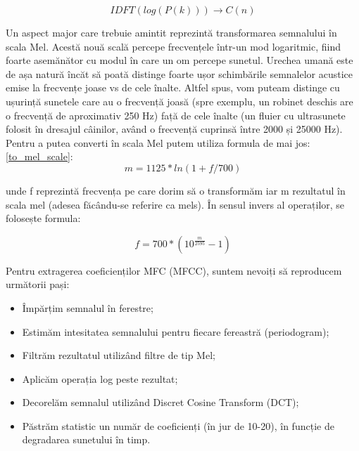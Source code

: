 \documentclass[a4paper,12pt]{report}
\begin{document}
    \begin{equation}
    \label{cepstrum_formula}
   	 	IDFT(log(P(k))) \rightarrow C(n)
    \end{equation}
    
    Un aspect major care trebuie amintit reprezintă transformarea semnalului în scala Mel. Acestă nouă scală percepe frecvențele într-un mod logaritmic, fiind foarte asemănător cu modul în care un om percepe sunetul. Urechea umană este de așa natură încăt să poată distinge foarte ușor schimbările semnalelor acustice emise la frecvențe joase vs de cele înalte. Altfel spus, vom puteam distinge cu ușurință sunetele care au o frecvență joasă (spre exemplu, un robinet deschis are o frecvență de aproximativ 250 Hz) față de cele înalte (un fluier cu ultrasunete folosit în dresajul câinilor, având o frecvență cuprinsă între 2000 și 25000 Hz).
    \\
    \bigbreak
    Pentru a putea converti în scala Mel putem utiliza formula de mai jos: \ref{to_mel_scale}:
    \begin{equation}
    \label{to_mel_scale}
    	m=1125 * ln(1+f/700)
    \end{equation}
    
     unde f reprezintă frecvența pe care dorim să o transformăm iar m rezultatul în scala mel (adesea făcându-se referire ca mels). În sensul invers al operaților, se folosește formula:
     
    \begin{equation}
    \label{from_mel_scale}
    	f=700*(10^{\frac{m}{2595}} -1)
    \end{equation} 
    
    Pentru extragerea coeficienților MFC (MFCC), suntem nevoiți să reproducem următorii pași:
    \begin{itemize}
    	\item Împărțim semnalul în ferestre;
    	\item Estimăm intesitatea semnalului pentru fiecare fereastră (periodogram);
    	\item Filtrăm rezultatul utilizând filtre de tip Mel;
    	\item Aplicăm operația log peste rezultat;
    	\item Decorelăm semnalul utilizând Discret Cosine Transform (DCT);
    	\item Păstrăm statistic un număr de coeficienți (în jur de 10-20), în funcție de degradarea sunetului în timp.
    \end{itemize}
\end{document}
